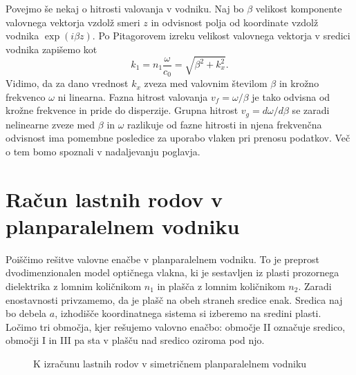 Povejmo še nekaj o hitrosti valovanja v vodniku.
Naj bo $\beta$ velikost komponente valovnega vektorja vzdolž smeri $z$ in odvisnost 
polja od koordinate vzdolž vodnika $\exp (i\beta z)$. Po Pitagorovem izreku velikost
valovnega vektorja v sredici vodnika zapišemo kot
\begin{equation}
k_1 = n_{1}\frac{\omega}{c_0}=\sqrt{\beta^{2}+k_{x}^{2}}
\label{9.0}.
\end{equation}
Vidimo, da za dano vrednost $k_{x}$ zveza med valovnim številom $\beta$
in krožno frekvenco $\omega$ ni linearna. Fazna hitrost 
valovanja $v_{f}=\omega/\beta$ je tako
odvisna od krožne frekvence in pride do disperzije. Grupna 
hitrost $v_{g}=d\omega/d\beta$ 
se zaradi nelinearne zveze med $\beta$ in $\omega$ 
razlikuje od fazne hitrosti in njena frekvenčna odvisnost 
ima pomembne posledice za uporabo vlaken pri prenosu podatkov. Več o tem bomo spoznali 
v nadaljevanju poglavja. 

\section{Račun lastnih rodov v planparalelnem vodniku}
Poiščimo rešitve valovne enačbe v planparalelnem vodniku. 
To je preprost dvodimenzionalen model optičnega vlakna, ki je sestavljen iz 
plasti prozornega dielektrika z lomnim količnikom $n_1$ in plašča z lomnim količnikom $n_2$.
Zaradi enostavnosti privzamemo, da je plašč na obeh straneh sredice enak.
Sredica naj bo debela $a$, izhodišče koordinatnega sistema
si izberemo na sredini plasti. Ločimo tri območja, kjer rešujemo valovno enačbo:
območje II označuje sredico, območji I in III pa sta v plašču nad sredico oziroma pod njo. 

\begin{figure}[h]
\centering
\def\svgwidth{120truemm} 

\caption{K izračunu lastnih rodov v simetričnem planparalelnem vodniku}
\label{fig:vodnikracun}
\end{figure}

